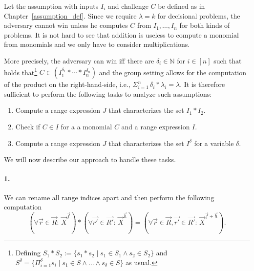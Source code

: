 %
%
Let the assumption with inputs $I_i$ and challenge $C$ be
  defined as in Chapter~\ref{assumption_def}.
Since we require $\lambda = k$ for decisional problems, the adversary
  cannot win unless he computes $C$ from $I_1,\ldots,I_n$ for both kinds of problems.
It is not hard to see that addition is useless to compute a monomial from monomials
  and we only have to consider multiplications.

More precisely, the adversary can win iff there are $\delta_i \in \mathbb{N}$ for $i \in [n]$
  such that holds that\footnote{
    Defining $S_1 * S_2 := \{ s_1 * s_2 \mid s_1 \in S_1 \land s_2 \in S_2\}$
    and $S^\delta = \{ \Pi_{i=1}^{\delta} s_i \mid s_1 \in S \land \ldots \land s_{\delta} \in S\}$
    as usual.
  }
$
  C \in (I_1^{\delta_1} * \cdots * I_n^{\delta_n})
$
  and the group setting allows for the computation of the product on the right-hand-side, i.e., 
$
  \Sigma_{i=1}^n\, \delta_i * \lambda_i = \lambda \text{.}
$
%
It is therefore sufficient to perform the following tasks to analyze such assumptions:
\begin{enumerate}
\item Compute a range expression $J$ that characterizes the set $I_1 * I_2$.
\item Check if $C \in I$ for a a monomial $C$ and a range expression $I$.
\item Compute a range expression $J$ that characterizes the set $I^\delta$ for a variable $\delta$.
\end{enumerate}
We will now describe our approach to handle these tasks.

\paragraph{1.}%
We can rename all range indices apart and then perform the following computation
$$
  (\forall \vec{r} \in \vec{R}:\, \vec{X}^{\vec{f}})
  *  (\forall \vec{r'} \in \vec{R'}:\, \vec{X}^{\vec{h}})
=
    (\forall \vec{r} \in \vec{R}, \vec{r'} \in \vec{R'}:\,
         \vec{X}^{\vec{f} + \vec{h}}) \text{.}
$$


